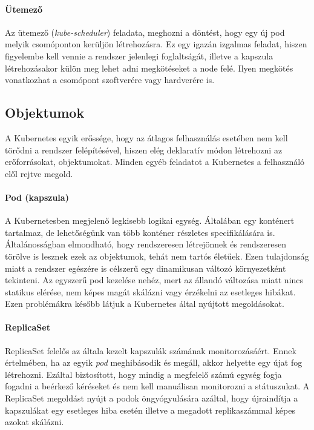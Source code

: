 \paragraph{Ütemező} Az ütemező (\textit{kube-scheduler}) feladata, meghozni a döntést, hogy egy új pod melyik csomóponton kerüljön létrehozásra.
Ez egy igazán izgalmas feladat, hiszen figyelembe kell vennie a rendszer jelenlegi foglaltságát, illetve a kapszula létrehozásakor külön meg lehet adni megkötéseket a node felé. 
Ilyen megkötés vonatkozhat a csomópont szoftverére vagy hardverére is.  

\subsection{Objektumok}
A Kubernetes egyik erőssége, hogy az átlagos felhasználás esetében nem kell törődni a rendszer felépítésével, hiszen elég deklaratív módon létrehozni az erőforrásokat, objektumokat.
Minden egyéb feladatot a Kubernetes a felhasználó elől rejtve megold.

\paragraph{Pod (kapszula)}
A Kubernetesben megjelenő legkisebb logikai egység.
Általában egy konténert tartalmaz, de lehetőségünk van több konténer részletes specifikálására is.
Általánosságban elmondható, hogy rendszeresen létrejönnek és rendszeresen törölve is lesznek ezek az objektumok, tehát nem tartós életűek.
Ezen tulajdonság miatt a rendszer egészére is célszerű egy dinamikusan változó környezetként tekinteni.
Az egyszerű pod kezelése nehéz, mert az állandó változása miatt nincs statikus elérése, nem képes magát skálázni vagy érzékelni az esetleges hibákat. 
Ezen problémákra később látjuk a Kubernetes által nyújtott megoldásokat.

\paragraph{ReplicaSet} 
ReplicaSet felelős az általa kezelt kapszulák számának monitorozásáért.
Ennek értelmében, ha az egyik \textit{pod} meghibásodik és megáll, akkor helyette egy újat fog létrehozni.
Ezáltal biztosított, hogy mindig a megfelelő számú egység fogja fogadni a beérkező kéréseket és nem kell manuálisan monitorozni a státuszukat.
A ReplicaSet megoldást nyújt a podok öngyógyulására azáltal, hogy újraindítja a kapszulákat egy esetleges hiba esetén illetve a megadott replikaszámmal képes azokat skálázni.

